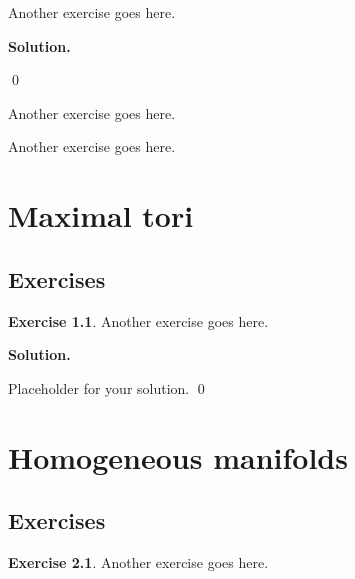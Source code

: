 \documentclass[12pt]{book}
\theoremstyle{definition}
\newtheorem{exercise}{Exercise}[chapter]
\newenvironment{solution}
{%
  \par\noindent\textbf{Solution.}\quad
}
{%
  \qed\par
}
\begin{document}
\begin{taggedexercise}[\textcolor{red}{TODO}]
  Another exercise goes here.
\end{taggedexercise}

\begin{taggedexercise}[\textcolor{red}{TODO}]
\end{taggedexercise}

\begin{solution}
\end{solution}

\begin{taggedexercise}[\textcolor{red}{TODO}]
  Another exercise goes here.
\end{taggedexercise}

\begin{taggedexercise}[\textcolor{red}{TODO}]
  Another exercise goes here.
\end{taggedexercise}

\chapter{Maximal tori}
\section{Exercises}

\begin{exercise}
Another exercise goes here.
\end{exercise}

\begin{solution}
Placeholder for your solution.
\end{solution}

\chapter{Homogeneous manifolds}
\section{Exercises}

\begin{exercise}
Another exercise goes here.
\end{exercise}
\end{document}
